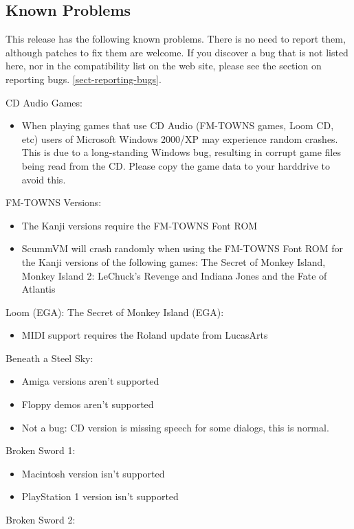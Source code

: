 \subsection{Known Problems}

This release has the following known problems. There is no need to report them,
although patches to fix them are welcome. If you discover a bug that is not
listed here, nor in the compatibility list on the web site, please see
the section on reporting bugs. \ref{sect-reporting-bugs}.

CD Audio Games:
  \begin{itemize}
  \item When playing games that use CD Audio (FM-TOWNS games, Loom CD, etc)
            users of Microsoft Windows 2000/XP may experience random crashes.
            This is due to a long-standing Windows bug, resulting in corrupt
            game files being read from the CD. Please copy the game data to
            your harddrive to avoid this.
  \end{itemize}
FM-TOWNS Versions:
  \begin{itemize}
  \item The Kanji versions require the FM-TOWNS Font ROM
  \item ScummVM will crash randomly when using the FM-TOWNS Font ROM for
            the Kanji versions of the following games:
            The Secret of Monkey Island, Monkey Island 2: LeChuck's Revenge
            and Indiana Jones and the Fate of Atlantis
  \end{itemize}
Loom (EGA):
The Secret of Monkey Island (EGA):
  \begin{itemize}
  \item MIDI support requires the Roland update from LucasArts
  \end{itemize}
Beneath a Steel Sky:
  \begin{itemize}
  \item Amiga versions aren't supported
  \item Floppy demos aren't supported
  \item Not a bug: CD version is missing speech for some dialogs, this is
            normal.
  \end{itemize}
Broken Sword 1:
  \begin{itemize}
  \item Macintosh version isn't supported
  \item PlayStation 1 version isn't supported
  \end{itemize}
Broken Sword 2:

